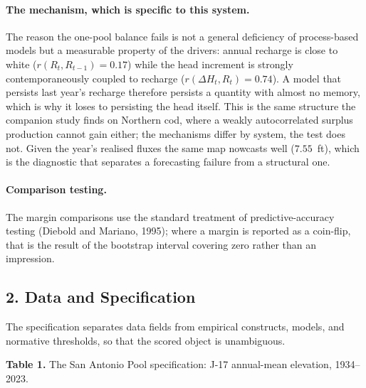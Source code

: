\documentclass[11pt]{article}
\begin{document}
\paragraph{The mechanism, which is specific to this system.} The reason the one-pool balance
fails is not a general deficiency of process-based models but a measurable property of the
drivers: annual recharge is close to white ($r(R_t,R_{t-1}) = 0.17$) while the head increment
is strongly contemporaneously coupled to recharge ($r(\Delta H_t, R_t) = 0.74$). A model that
persists last year's recharge therefore persists a quantity with almost no memory, which is why
it loses to persisting the head itself. This is the same structure the companion study finds on
Northern cod, where a weakly autocorrelated surplus production cannot gain either; the
mechanisms differ by system, the test does not. Given the year's realised fluxes the same map
nowcasts well ($7.55$~ft), which is the diagnostic that separates a forecasting failure from a
structural one.

\paragraph{Comparison testing.} The margin comparisons use the standard treatment of
predictive-accuracy testing (Diebold and Mariano, 1995); where a margin is reported as a
coin-flip, that is the result of the bootstrap interval covering zero rather than an impression.

\subsection{2. Data and Specification}\label{edw-data-and-specification}

The specification separates data fields from empirical constructs,
models, and normative thresholds, so that the scored object is
unambiguous.

\textbf{Table 1.} The San Antonio Pool specification: J-17 annual-mean
elevation, 1934--2023.
\end{document}
